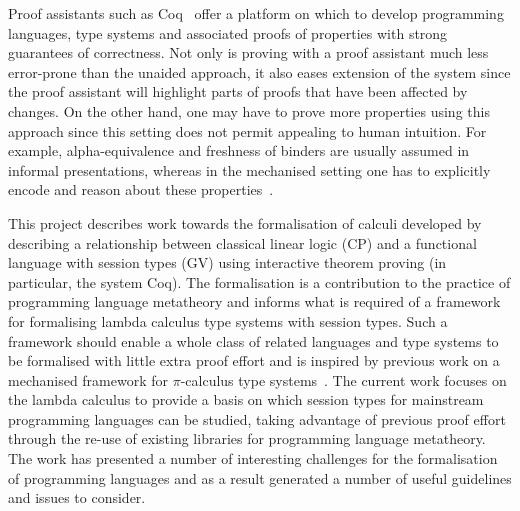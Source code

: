 Proof assistants such as Coq~\cite{Coq:manual} offer a platform on which to
develop programming languages, type systems and associated proofs of
properties with strong guarantees of correctness. Not only is proving with a
proof assistant much less error-prone than the unaided approach, it also eases
extension of the system since the proof assistant will highlight parts of
proofs that have been affected by changes. On the other hand, one may have to
prove more properties using this approach since this setting does not permit
appealing to human intuition. For example, alpha-equivalence and freshness of
binders are usually assumed in informal presentations, whereas in the
mechanised setting one has to explicitly encode and reason about these
properties~\cite{Aydemir:2005:MMM, Aydemir:2008:EFM}.

This project describes work towards the formalisation of calculi developed by
\citeauthor{Wadler:2014}~\cite{Wadler:2014} describing a relationship between
classical linear logic (CP) and a functional language with session types (GV)
using interactive theorem proving (in particular, the system Coq). The
formalisation is a contribution to the practice of programming language
metatheory and informs what is required of a framework for formalising lambda
calculus type systems with session types. Such a framework should enable a
whole class of related languages and type systems to be formalised with little
extra proof effort and is inspired by previous work on a mechanised framework
for $\pi$-calculus type systems~\cite{Gay:2001:FFP}. The current work focuses
on the lambda calculus to provide a basis on which session types for
mainstream programming languages can be studied, taking advantage of previous
proof effort through the re-use of existing libraries for programming language
metatheory. The work has presented a number of interesting challenges for the
formalisation of programming languages and as a result generated a number of
useful guidelines and issues to consider.

